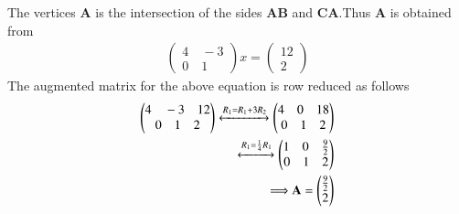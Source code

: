 \documentclass[journal,12pt,twocolumn]{IEEEtran}
\newcommand{\myvec}[1]{\ensuremath{\begin{pmatrix}#1\end{pmatrix}}}
\numberwithin{equation}{subsection}
\let\vec\mathbf
\begin{document}
 The vertices $\vec{A}$ is the intersection of the sides $\vec{AB}$ and $\vec{CA}$.Thus $\vec{A}$ is obtained from
 \begin{align}
 \myvec{4\quad-3\\0\quad1}x=\myvec{12\\2}
 \end{align}
 The augmented matrix for the above equation is row reduced as follows
 \begin{align}
 \myvec{4\quad-3\quad 12\\0\quad1\quad2}\xleftrightarrow{R_1=R_1+3R_2}\myvec{4\quad0\quad 18\\0\quad1\quad2}\\\xleftrightarrow{R_1=\frac{1}{4}R_1}\myvec{1\quad0\quad\frac{9}{2}\\0\quad1\quad2}\\
 \Longrightarrow\vec{A}=\myvec{\frac{9}{2}\\2}
 \end{align}
 
\end{document}
